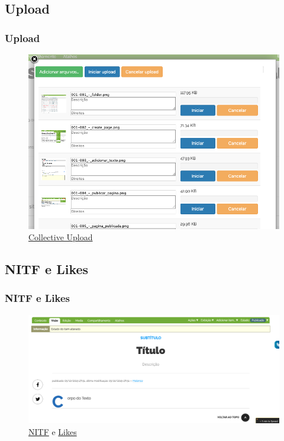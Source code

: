 \documentclass{beamer}
\begin{document}
\subsection{Upload}
\begin{frame}
    \frametitle{Upload}
    \begin{figure}
        \includegraphics[height=.7\textheight]{./img/001-009_-_upload.png}
        \caption{\href{https://github.com/collective/collective.upload}{Collective Upload}}
    \end{figure}
\end{frame}

\subsection{NITF e Likes}
\begin{frame}
    \frametitle{NITF e Likes}
    \begin{figure}
        \includegraphics[height=.6\textheight]{./img/001-010_-_nitf_e_likes.png}
        \caption{\href{https://github.com/collective/collective.nitf}{NITF} e \href{https://github.com/collective/sc.social.likes}{Likes}}
    \end{figure}
\end{frame}
\end{document}
